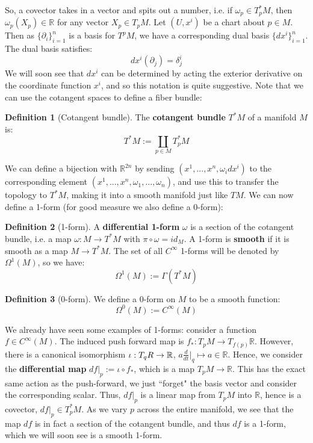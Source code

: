 \documentclass[11pt, oneside]{article}   	%
\theoremstyle{definition}
\newtheorem{definition}{Definition}[section]
\begin{document}
So, a covector takes in a vector and spits out a number, i.e. if $\omega_p\in T_p^* M$, then $\omega_p(X_p)\in\mathbb R$ 
for any vector $X_p\in T_p M$. Let $(U, x^i)$ be a chart about $p\in M$. Then as $\{\partial_i\}_{i = 1}^n$ is a basis for 
$T^p M$, we have a corresponding dual basis $\{dx^i\}_{i = 1}^n$. The dual basis satisfies:
\begin{equation}
	dx^i(\partial_j) = \delta^i_j
\end{equation}
We will soon see that $dx^i$ can be determined by acting the exterior derivative on the coordinate function $x^i$, and so this 
notation is quite suggestive. Note that we can use the cotangent spaces to define a fiber bundle:
\begin{definition}[Cotangent bundle]
	The \textbf{cotangent bundle} $T^*M$ of a manifold $M$ is:
	\begin{equation}
		T^* M := \coprod_{p\in M} T_p^* M
	\end{equation}
\end{definition}
We can define a bijection with $\mathbb R^{2n}$ by sending $(x^1, ..., x^n, \omega_i dx^i)$ to the corresponding element 
$(x^1, ..., x^n, \omega_1, ..., \omega_n)$, and use this to transfer the topology to $T^*M$, making it into a smooth manifold 
just like $TM$. We can now define a 1-form (for good measure we also define a 0-form):
\begin{definition}[1-form]
	A \textbf{differential 1-form} $\omega$ is a section of the cotangent bundle, i.e. a map $\omega : M\rightarrow T^* M$ with 
	$\pi\circ \omega = id_M$. A 1-form is \textbf{smooth} if it is smooth as a map $M\rightarrow T^*M$. The set of all 
	$C^\infty$ 1-forms will be denoted by $\Omega^1(M)$, so we have:
	\begin{equation}
		\Omega^1(M) := \Gamma(T^*M)
	\end{equation}
\end{definition}
\begin{definition}[0-form]
	We define a 0-form on $M$ to be a smooth function:
	\begin{equation}
		\Omega^0(M) := C^\infty(M)
	\end{equation}
\end{definition}
We already have seen some examples of 1-forms: consider a function $f\in C^\infty(M)$. The induced push forward map 
is $f_* : T_p M\rightarrow T_{f(p)}\mathbb R$. However, there is a canonical isomorphism $\iota : T_{q}\mathbb \mathbb R
\rightarrow\mathbb R$, $a\frac{d}{dt}|_q\mapsto a\in\mathbb R$. Hence, we consider the \textbf{differential map} $df|_p 
:= \iota\circ f_*$, which is a map $T_p M\rightarrow \mathbb R$. This has the exact same action as the push-forward, we 
just ``forget" the basis vector and consider the corresponding scalar. Thus, $df|_p$ is a linear map from $T_p M$ into 
$\mathbb R$, hence is a covector, $df|_p\in T_p^* M$. As we vary $p$ across the entire manifold, we see that the map $df$ is 
in fact a section of the cotangent bundle, and thus $df$ is a 1-form, which we will soon see is a smooth 1-form. 
\end{document}
